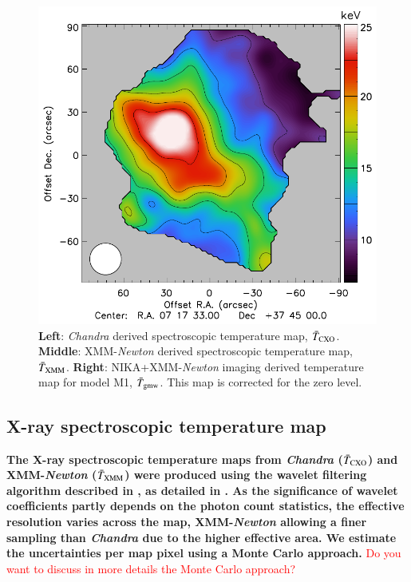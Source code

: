 \documentclass[twocolumn,traditabstract]{aa}
\begin{document}
\begin{figure}[h]
\includegraphics[trim=1.6cm 0cm 0cm 0cm, clip=true, totalheight=6.7cm]{Figure/Thermo_TSZclean1.pdf}
\caption{\footnotesize{{\bf Left}: \textit{Chandra} derived spectroscopic temperature map, $\bar{T}_{\rm CXO}$. {\bf Middle}: XMM-\textit{Newton} derived spectroscopic temperature map, $\bar{T}_{\rm XMM}$. {\bf Right}: NIKA+XMM-\textit{Newton} imaging derived temperature map for model M1, $\bar{T}_{\rm gmw}$. This map is corrected for the zero level.}}
\label{fig:T_maps}
\end{figure}

\subsection{X-ray spectroscopic temperature map}\label{sec:Xray_spectroscopic_temperature_map}
{\bf The X-ray spectroscopic temperature maps from \textit{Chandra} ($\bar{T}_{\rm CXO}$) and XMM-\textit{Newton} ($\bar{T}_{\rm XMM}$) were produced using the wavelet filtering algorithm described in \cite{Bourdin2008}, as detailed in \cite{Adam2016b}. As the significance of wavelet coefficients partly depends on the photon count statistics, the effective resolution varies across the map, XMM-\textit{Newton} allowing a finer sampling than \textit{Chandra} due to the higher effective area. We estimate the uncertainties per map pixel using a Monte Carlo approach.} \textcolor{red}{Do you want to discuss in more details the Monte Carlo approach?}
\end{document}
